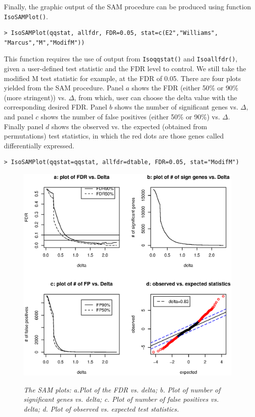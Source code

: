 Finally, the graphic output of the SAM procedure can be produced using function \texttt{IsoSAMPlot()}.
\begin{center}
\begin{boxit}
\begin{verbatim}
> IsoSAMPlot(qqstat, allfdr, FDR=0.05, stat=c(E2","Williams",
"Marcus","M","ModifM"))
\end{verbatim}
\end{boxit}
\end{center}

This function requires the use of output from \texttt{Isoqqstat()} and \texttt{Isoallfdr()}, given a user-defined test statistic
and the FDR level to control. We still take the modified M test statistic for example, at the FDR of 0.05. There are four plots
yielded from the SAM procedure. Panel $a$ shows the FDR (either 50\% or 90\% (more stringent)) vs. $\Delta$, from which, user can choose the delta value with
the corresponding desired FDR. Panel $b$ shows the number of significant genes vs. $\Delta$, and panel $c$ shows the number of false positives (either 50\% or 90\%) vs. $\Delta$. Finally panel $d$ shows the observed vs. the expected (obtained from permutations) test statistics, in which the red dots are those genes called differentially expressed.
\begin{center}
\begin{boxit}
\begin{verbatim}
> IsoSAMPlot(qqstat=qqstat, allfdr=dtable, FDR=0.05, stat="ModifM")
\end{verbatim}
\end{boxit}
\end{center}

\begin{figure}[!h]
\centering
{\includegraphics[width=.7\textwidth]{SAMPlot.eps}}
\caption{\em {The SAM plots: a.Plot of the FDR vs. delta; b. Plot of number of significant genes vs. delta; c. Plot of
number of false positives vs. delta; d. Plot of observed vs. expected test statistics.}} \label{IsoBHPlot}
\end{figure}



